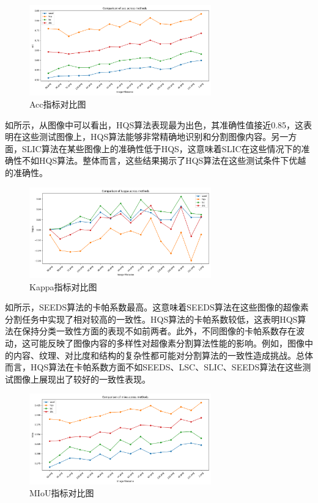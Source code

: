 \newpage

\begin{figure}[htbp]
	\centering
	\includegraphics[width=0.7\textwidth]{pic/acc.png}
	\caption{Acc指标对比图}
    \label{fig:acc}
\end{figure}

如所示，从图像中可以看出，HQS算法表现最为出色，其准确性值接近0.85，这表明在这些测试图像上，HQS算法能够非常精确地识别和分割图像内容。另一方面，SLIC算法在某些图像上的准确性低于HQS，这意味着SLIC在这些情况下的准确性不如HQS算法。整体而言，这些结果揭示了HQS算法在这些测试条件下优越的准确性。

\begin{figure}[htbp]
	\centering
	\includegraphics[width=0.7\textwidth]{pic/kappa.png}
	\caption{Kappa指标对比图}
    \label{fig:kappa}
\end{figure}

如所示，SEEDS算法的卡帕系数最高。这意味着SEEDS算法在这些图像的超像素分割任务中实现了相对较高的一致性。HQS算法的卡帕系数较低，这表明HQS算法在保持分类一致性方面的表现不如前两者。此外，不同图像的卡帕系数存在波动，这可能反映了图像内容的多样性对超像素分割算法性能的影响。例如，图像中的内容、纹理、对比度和结构的复杂性都可能对分割算法的一致性造成挑战。总体而言，HQS算法在卡帕系数方面不如SEEDS、LSC、SLIC、SEEDS算法在这些测试图像上展现出了较好的一致性表现。

\begin{figure}[htbp]
	\centering
	\includegraphics[width=0.7\textwidth]{pic/miou.png}
	\caption{MIoU指标对比图}
    \label{fig:miou}
\end{figure}

